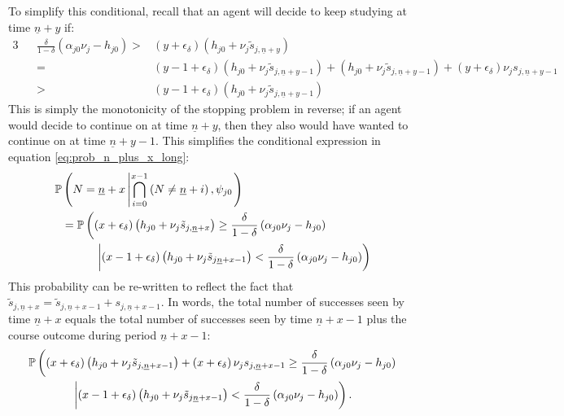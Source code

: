 \documentclass[11 pt]{article}
\newcommand{\pr}[1]{\left( #1 \right)}
\newcommand{\crs}[2]{#1 \left\vert #2 \right.}
\newcommand{\pass}{s}
\newcommand*{\ks}[1][t]{\tilde{\pass}_{j #1}}
\begin{document}
To simplify this conditional, recall that an agent will decide to keep studying at time $\underline{n} + y$ if:
\begin{alignat*}{3}
&&
\frac{\delta}{1 - \delta}
\pr{\alpha_{j0} \nu_j - h_{j0}}
>&
(y + \epsilon_\delta)
\pr{h_{j0} + \nu_j \ks[, \underline{n} + y]}
\\
&&
=&
(y - 1 + \epsilon_\delta)
\pr{h_{j0} + \nu_j \ks[, \underline{n} + y -1]}
+ 
\pr{h_{j0} + \nu_j \ks[, \underline{n} + y -1]}
+
(y + \epsilon_\delta)
\nu_j \pass_{j, \underline{n} + y - 1}
\\
&&
>&
(y - 1 + \epsilon_\delta)
\pr{h_{j0} + \nu_j \ks[, \underline{n} + y -1]}
\end{alignat*}
This is simply the monotonicity of the stopping problem in reverse; if an agent would decide to continue on at time $\underline{n} + y$, then they also would have wanted to continue on at time $\underline{n} + y - 1$.
This simplifies the conditional expression in equation \eqref{eq:prob_n_plus_x_long}:
\begin{align}
    \nonumber
    \PP  &\pr{\crs{
        N = \underline{n} + x
    }{
    \bigcap_{i=0}^{x-1}
        \pr{N \neq \underline{n} + i}
    , \psi_{j0}}}
    \\ 
    \nonumber
    &=
    \PP \left( 
        (x + \epsilon_\delta)
        \pr{h_{j0} + \nu_j \ks[, \underline{n} +x]
        }
        \geq
        \frac{\delta}{1 - \delta}
        \pr{\alpha_{j0} \nu_j - h_{j0}}
    \right.
    \\ \nonumber
    &\quad\quad\quad\left\vert
        (x - 1 + \epsilon_\delta)
        \pr{h_{j0} 
        + \nu_j \ks[\underline{n} + x - 1]
        }
        <
        \frac{\delta}{1 - \delta}
        \pr{\alpha_{j0} \nu_j - h_{j0}}
    \right)
\end{align}
This probability can be re-written to reflect the fact that $\ks[,\underline{n} + x] = \ks[,\underline{n} + x -1] + \pass_{j, \underline{n} + x - 1}$.
In words, the total number of successes seen by time $\underline{n} + x$ equals the total number of successes seen by time $\underline{n} + x - 1$ plus the course outcome during period $\underline{n} + x - 1$:
\begin{multline*}
    \PP \left( 
        \pr{x + \epsilon_\delta}
        \pr{h_{j0} 
        + \nu_j \ks[, \underline{n} + x - 1]}
        +
        \pr{x + \epsilon_\delta}
        \nu_j \pass_{j, \underline{n} + x - 1}
        \geq
        \frac{\delta}{1 - \delta}
        \pr{\alpha_{j0} \nu_j - h_{j0}}
    \right.
    \\
    \left\vert
        (x - 1 + \epsilon_\delta)
        \pr{h_{j0} 
        + \nu_j \ks[\underline{n} + x - 1]
        }
        <
        \frac{\delta}{1 - \delta}
        \pr{\alpha_{j0} \nu_j - h_{j0}}
    \right).
\end{multline*}
\end{document}
